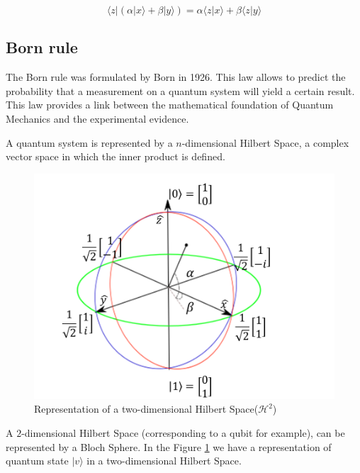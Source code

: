  

\begin{equation}
\label{eq_linearity}
\langle z\vert(\alpha\vert x\rangle+\beta\vert y\rangle)=\alpha\langle z\vert x\rangle+\beta\langle z\vert y\rangle
\end{equation}


\subsection{Born rule}
\label{subsubsec:bornrule}

The Born rule was formulated by Born in 1926. This law allows to predict the probability that a measurement on a quantum system will yield a certain result. This law provides a link between the mathematical foundation of Quantum Mechanics and the experimental evidence\cite{VanRijsbergen2004}\cite{Landsman2009}. 

A quantum system is represented by a $n$-dimensional Hilbert Space, a complex vector space in which the inner product is defined. 




\begin{figure}[h]
\centering 

\includegraphics[scale=0.35]{Figures/bloch_sphere.png}
\caption{Representation of a two-dimensional Hilbert Space($\mathcal{H}^{2}$)}
\label{fig:circle}
\end{figure}


A $2$-dimensional Hilbert Space (corresponding to a qubit for example), can be represented by a Bloch Sphere. In the Figure \ref{fig:circle} we have a representation of quantum state $\vert v \rangle$ in a two-dimensional Hilbert Space. 



